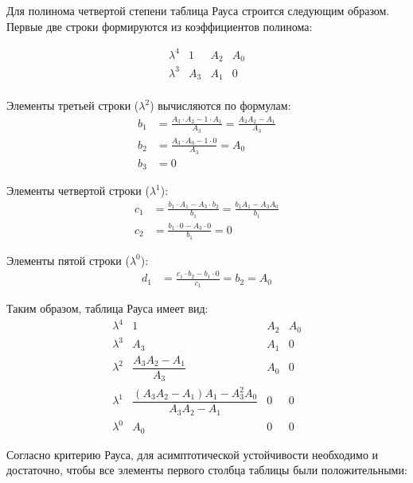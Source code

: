 \documentclass[a4paper, 12pt]{article}
\begin{document}
Для полинома четвертой степени таблица Рауса строится следующим образом. Первые две строки формируются из коэффициентов полинома:

\[
\begin{array}{c|ccc}
\lambda^4 & 1 & A_2 & A_0 \\
\lambda^3 & A_3 & A_1 & 0 \\
\end{array}
\]

Элементы третьей строки (\(\lambda^2\)) вычисляются по формулам:
\begin{align}
b_1 &= \frac{A_3 \cdot A_2 - 1 \cdot A_1}{A_3} = \frac{A_3 A_2 - A_1}{A_3} \\
b_2 &= \frac{A_3 \cdot A_0 - 1 \cdot 0}{A_3} = A_0 \\
b_3 &= 0
\end{align}

Элементы четвертой строки (\(\lambda^1\)):
\begin{align}
c_1 &= \frac{b_1 \cdot A_1 - A_3 \cdot b_2}{b_1} = \frac{b_1 A_1 - A_3 A_0}{b_1} \\
c_2 &= \frac{b_1 \cdot 0 - A_3 \cdot 0}{b_1} = 0
\end{align}

Элементы пятой строки (\(\lambda^0\)):
\begin{align}
d_1 &= \frac{c_1 \cdot b_2 - b_1 \cdot 0}{c_1} = b_2 = A_0
\end{align}

Таким образом, таблица Рауса имеет вид:
\[
\begin{array}{c|ccc}
\lambda^4 & 1 & A_2 & A_0 \\
\lambda^3 & A_3 & A_1 & 0 \\
\lambda^2 & \dfrac{A_3 A_2 - A_1}{A_3} & A_0 & 0 \\
\lambda^1 & \dfrac{(A_3 A_2 - A_1) A_1 - A_3^2 A_0}{A_3 A_2 - A_1} & 0 & 0 \\
\lambda^0 & A_0 & 0 & 0
\end{array}
\]


Согласно критерию Рауса, для асимптотической устойчивости необходимо и достаточно, чтобы все элементы первого столбца таблицы были положительными:
\end{document}
